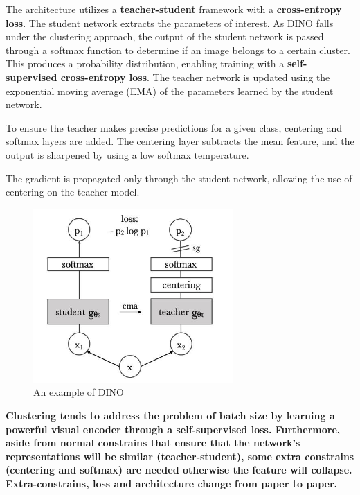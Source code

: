 The architecture utilizes a \textbf{teacher-student} framework with a \textbf{cross-entropy loss}. The student network extracts the parameters of interest. As DINO falls under the clustering approach, the output of the student network is passed through a softmax function to determine if an image belongs to a certain cluster. This produces a probability distribution, enabling training with a \textbf{self-supervised cross-entropy loss}. The teacher network is updated using the exponential moving average (EMA) of the parameters learned by the student network.

To ensure the teacher makes precise predictions for a given class, centering and softmax layers are added. The centering layer subtracts the mean feature, and the output is sharpened by using a low softmax temperature.

The gradient is propagated only through the student network, allowing the use of centering on the teacher model.

\begin{figure}[H]
    \centering
    \includegraphics[width=0.75\linewidth]{tikz/DINO.png}
    \caption{An example of DINO}
    \label{fig:DINO}
\end{figure}


\textbf{Clustering tends to address the problem of batch size by learning a powerful visual encoder through a self-supervised loss. Furthermore, aside from normal constrains that ensure that the network's representations will be similar (teacher-student), some extra constrains (centering and softmax) are needed otherwise the feature will collapse. Extra-constrains, loss and architecture change from paper to paper.}




